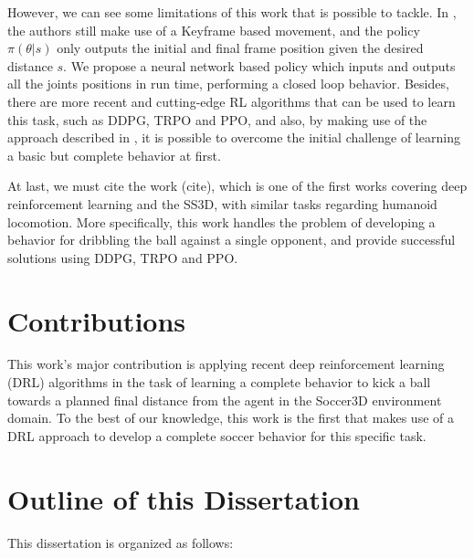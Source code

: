 However, we can see some limitations of this work that is possible to tackle. In \cite{abbas}, the authors still make use of a Keyframe based movement, and the policy $\pi(\theta | s)$ only outputs the initial and final frame position given the desired distance $s$. We propose a neural network based policy which inputs and outputs all the joints positions in run time, performing a closed loop behavior. Besides, there are more recent and cutting-edge RL algorithms that can be used to learn this task, such as DDPG, TRPO and PPO, and also, by making use of the approach described in \cite{deepmimic}, it is possible to overcome the initial challenge of learning a basic but complete behavior at first.

At last, we must cite the work (cite), which is one of the first works covering deep reinforcement learning and the SS3D, with similar tasks regarding humanoid locomotion. More specifically, this work handles the problem of developing a behavior for dribbling the ball against a single opponent, and provide successful solutions using DDPG, TRPO and PPO.

\section{Contributions}

This work's major contribution is applying recent deep reinforcement learning (DRL) algorithms in the task of learning a complete behavior to kick a ball towards a planned final distance from the agent in the Soccer3D environment domain. To the best of our knowledge, this work is the first that makes use of a DRL approach to develop a complete soccer behavior for this specific task.

\section{Outline of this Dissertation}

This dissertation is organized as follows:

